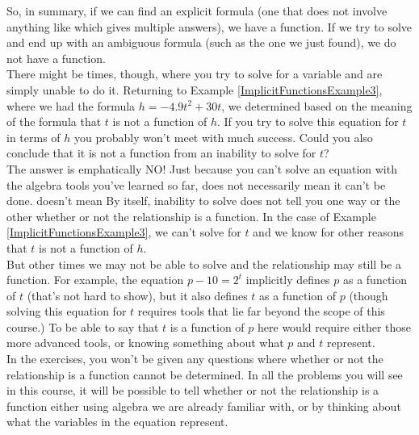 So, in summary, if we can find an explicit formula (one that does not involve anything like \quotes{$\pm$} which gives multiple answers), we have a function. If we try to solve and end up with an ambiguous formula (such as the one we just found), we do not have a function.\\

There might be times, though, where you try to solve for a variable and are simply unable to do it. Returning to Example \ref{ImplicitFunctionsExample3}, where we had the formula $h=-4.9t^2+30t$, we determined based on the meaning of the formula that $t$ is not a function of $h$. If you try to solve this equation for $t$ in
terms of $h$ you probably won’t meet with much success. Could you also conclude that it is not a function from an inability to solve for $t$?\\

The answer is emphatically NO! Just because you can’t solve an equation with the algebra tools you’ve learned so far, does not necessarily mean it can’t be done.  doesn’t mean  By itself, inability to solve does not tell you one way or the other whether or not the relationship is a function. In the case of Example \ref{ImplicitFunctionsExample3}, we can’t solve for $t$ and we know for other reasons that $t$ is not a function of $h$.\\

But other times we may not be able to solve and the relationship may still be a function. For example, the equation $p-10=2^t$ implicitly defines $p$ as a function of $t$ (that’s not hard to show), but it also defines $t$ as a function of $p$ (though solving this equation for $t$ requires tools that lie far
beyond the scope of this course.) To be able to say that $t$ is a function of $p$ here would require either those more advanced tools, or knowing something about what $p$ and $t$ represent.\\

In the exercises, you won’t be given any questions where whether or not the relationship is a function cannot be determined. In all the problems you will see in this course, it will be possible to tell whether or not the relationship is a function either using algebra we are already familiar with, or by thinking about what the variables in the equation represent.\\

%
%


